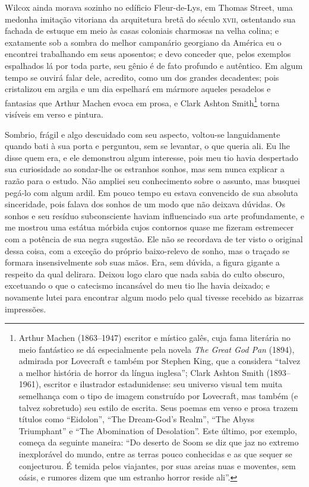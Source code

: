 Wilcox ainda morava sozinho no edíficio Fleur-de-Lys, em Thomas Street,
uma medonha imitação vitoriana da arquitetura bretã do século \textsc{xvii},
ostentando sua fachada de estuque em meio às casas coloniais charmosas
na velha colina; e exatamente sob a sombra do melhor campanário
georgiano da América eu o encontrei trabalhando em seus aposentos; e
devo conceder que, pelos exemplos espalhados lá por toda parte, seu
gênio é de fato profundo e autêntico. Em algum tempo se ouvirá falar
dele, acredito, como um dos grandes decadentes; pois cristalizou em
argila e um dia espelhará em mármore aqueles pesadelos e fantasias que
Arthur Machen evoca em prosa, e Clark Ashton Smith\footnote{Arthur
  Machen (1863--1947) escritor e místico galês, cuja fama literária no
  meio fantástico se dá especialmente pela novela \emph{The Great God
  Pan} (1894), admirada por Lovecraft e também por Stephen King, que a
  considera ``talvez a melhor história de horror da língua inglesa'';
  Clark Ashton Smith (1893--1961), escritor e ilustrador estadunidense:
  seu universo visual tem muita semelhança com o tipo de imagem
  construído por Lovecraft, mas também (e talvez sobretudo) seu estilo
  de escrita. Seus poemas em verso e prosa trazem títulos como
  ``Eidolon'', ``The Dream-God's Realm'', ``The Abyss Triumphant'' e
  ``The Abomination of Desolation''. Este último, por exemplo, começa da
  seguinte maneira: ``Do deserto de Soom se diz que jaz no extremo
  inexplorável do mundo, entre as terras pouco conhecidas e as que
  sequer se conjecturou. É temida pelos viajantes, por suas areias nuas
  e moventes, sem oásis, e rumores dizem que um estranho horror reside
  ali''.} torna visíveis em verso e pintura.

Sombrio, frágil e algo descuidado com seu aspecto, voltou-se
languidamente quando bati à sua porta e perguntou, sem se levantar, o
que queria ali. Eu lhe disse quem era, e ele demonstrou algum interesse,
pois meu tio havia despertado sua curiosidade ao sondar-lhe os estranhos
sonhos, mas sem nunca explicar a razão para o estudo. Não ampliei seu
conhecimento sobre o assunto, mas busquei pegá-lo com algum ardil. Em
pouco tempo eu estava convencido de sua absoluta sinceridade, pois
falava dos sonhos de um modo que não deixava dúvidas. Os sonhos e seu resíduo
subconsciente haviam influenciado sua arte profundamente, e me mostrou
uma estátua mórbida cujos contornos quase me fizeram estremecer com a
potência de sua negra sugestão. Ele não se recordava de ter visto o
original dessa coisa, com a exceção do próprio baixo-relevo de
sonho, mas o traçado se formara insensivelmente sob suas mãos. Era,
sem dúvida, a figura gigante a respeito da qual delirara. Deixou logo
claro que nada sabia do culto obscuro, excetuando o que o catecismo
incansável do meu tio lhe havia deixado; e novamente lutei para
encontrar algum modo pelo qual tivesse recebido as bizarras impressões.

